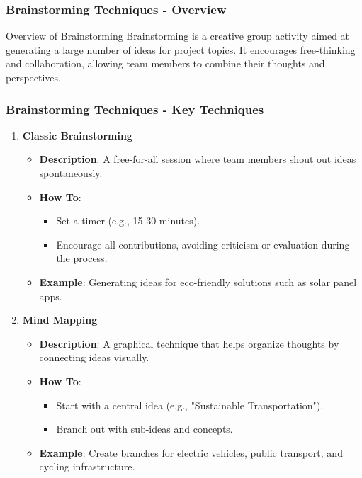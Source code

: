 \documentclass{beamer}
\begin{document}
\begin{frame}[fragile]
    \frametitle{Brainstorming Techniques - Overview}
    \begin{block}{Overview of Brainstorming}
        Brainstorming is a creative group activity aimed at generating a large number of ideas for project topics. It encourages free-thinking and collaboration, allowing team members to combine their thoughts and perspectives.
    \end{block}
\end{frame}

\begin{frame}[fragile]
    \frametitle{Brainstorming Techniques - Key Techniques}
    \begin{enumerate}
        \item \textbf{Classic Brainstorming}
        \begin{itemize}
            \item \textbf{Description}: A free-for-all session where team members shout out ideas spontaneously.
            \item \textbf{How To}:
                \begin{itemize}
                    \item Set a timer (e.g., 15-30 minutes).
                    \item Encourage all contributions, avoiding criticism or evaluation during the process.
                \end{itemize}
            \item \textbf{Example}: Generating ideas for eco-friendly solutions such as solar panel apps.
        \end{itemize}
        
        \item \textbf{Mind Mapping}
        \begin{itemize}
            \item \textbf{Description}: A graphical technique that helps organize thoughts by connecting ideas visually.
            \item \textbf{How To}:
                \begin{itemize}
                    \item Start with a central idea (e.g., "Sustainable Transportation").
                    \item Branch out with sub-ideas and concepts.
                \end{itemize}
            \item \textbf{Example}: Create branches for electric vehicles, public transport, and cycling infrastructure.
        \end{itemize}
    \end{enumerate}
\end{frame}
\end{document}
